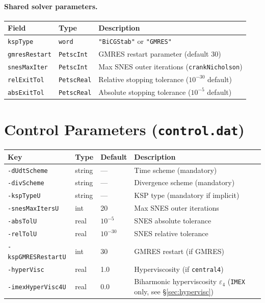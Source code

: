 \documentclass[12pt,a4paper]{article}
\begin{document}
	\paragraph{Shared solver parameters.}
	\begin{center}
		\begin{tabular}{lll}
			\toprule
			Field & Type & Description \\
			\midrule
			\texttt{kspType} & \texttt{word} & \texttt{"BiCGStab"} or \texttt{"GMRES"} \\
			\texttt{gmresRestart} & \texttt{PetscInt} & GMRES restart parameter (default 30) \\
			\texttt{snesMaxIter} & \texttt{PetscInt} & Max SNES outer iterations (\texttt{crankNicholson}) \\
			\texttt{relExitTol} & \texttt{PetscReal} & Relative stopping tolerance ($10^{-30}$ default) \\
			\texttt{absExitTol} & \texttt{PetscReal} & Absolute stopping tolerance ($10^{-5}$ default) \\
			\bottomrule
		\end{tabular}
	\end{center}
	
	\section{Control Parameters (\texttt{control.dat})}
	
	\begin{center}
		\begin{tabular}{llll}
			\toprule
			Key & Type & Default & Description \\
			\midrule
			\texttt{-dUdtScheme} & string & --- & Time scheme (mandatory) \\
			\texttt{-divScheme} & string & --- & Divergence scheme (mandatory) \\
			\texttt{-kspTypeU} & string & --- & KSP type (mandatory if implicit) \\
			\texttt{-snesMaxItersU} & int & 20 & Max SNES outer iterations \\
			\texttt{-absTolU} & real & $10^{-5}$ & SNES absolute tolerance \\
			\texttt{-relTolU} & real & $10^{-30}$ & SNES relative tolerance \\
			\texttt{-kspGMRESRestartU} & int & 30 & GMRES restart (if GMRES) \\
			\texttt{-hyperVisc} & real & 1.0 & Hyperviscosity (if \texttt{central4}) \\
			\texttt{-imexHyperVisc4U} & real & 0.0 & Biharmonic hyperviscosity $\varepsilon_4$ (\texttt{IMEX} only, see \S\ref{sec:hypervisc}) \\
		\end{tabular}
	\end{center}
	
\end{document}
